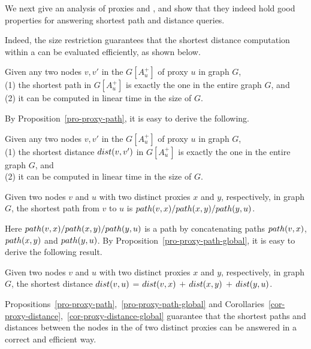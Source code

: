 We next give an analysis of proxies and \dras, and show that they indeed hold good properties for answering shortest path and distance queries.
%



Indeed, the size restriction guarantees that the shortest distance computation within a \dra can be evaluated efficiently,
as shown below.


\begin{prop}
\label{pro-proxy-path} Given any two nodes $v, v'$ in the \dra $G[A^+_u]$ of proxy $u$ in graph $G$, \\
(1) the shortest path in $G[A^+_u]$ is exactly the one in the entire graph $G$, and\\
(2) it can be computed in linear time in the size of $G$.
\end{prop}


By Proposition~\ref{pro-proxy-path}, it is easy to derive the following.

\begin{cor}
\label{cor-proxy-distance} Given any two nodes $v, v'$ in the \dra $G[A^+_u]$ of proxy $u$ in graph $G$, \\
(1) the shortest distance $\dist(v, v')$ in $G[A^+_u]$ is exactly the one in the entire graph $G$, and\\
(2) it can be computed in linear time in the size of $G$.
\end{cor}


\begin{prop}
\label{pro-proxy-path-global} Given two nodes $v$ and $u$ with two distinct proxies $x$ and $y$, respectively, in graph $G$, the shortest path from $v$ to $u$ is $\path(v, x)/\path(x, y)/\path(y, u)$.
\end{prop}


Here $\path(v, x)/\path(x, y)/\path(y, u)$ is a path by concatenating paths $\path(v,x)$, $\path(x,y)$ and $\path(y,u)$.
By Proposition~\ref{pro-proxy-path-global}, it is easy to derive the following result.

\begin{cor}
\label{cor-proxy-distance-global} Given two nodes $v$ and $u$ with two distinct proxies $x$ and $y$, respectively, in graph $G$, the shortest distance $\dist(v, u)$ = $\dist(v, x)$ $+$ $\dist(x, y)$  $+$ $\dist(y, u)$.
\end{cor}


Propositions~\ref{pro-proxy-path},~\ref{pro-proxy-path-global} and Corollaries~\ref{cor-proxy-distance},~\ref{cor-proxy-distance-global} guarantee that the shortest paths and distances between the nodes in the \dras of two distinct proxies can be answered in a correct and efficient way.






